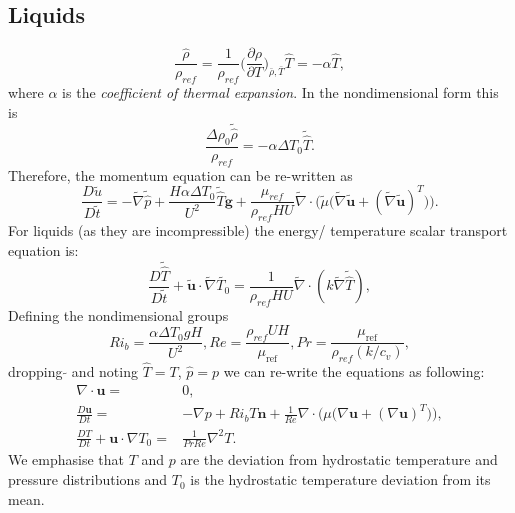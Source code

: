 \documentclass[preprint,12pt]{article}
\begin{document}
\subsection{Liquids}
 \begin{equation}
 \frac{\hat{\rho}}{\rho_{ref}}=\frac{1}{\rho_{ref}}\Big(\frac{\partial \rho}{\partial T}\Big)_{\bar{\rho},\bar{T}}\hat{T}=-\alpha\hat{T},
 \end{equation}
 where $\alpha$ is the \textit{coefficient of thermal expansion}. In the non\textendash dimensional form this is 
 \begin{equation}
\frac{\Delta \rho_0\tilde{\hat{\rho}}}{{\rho_{ref}}}=-\alpha\Delta T_0\tilde{\hat{T}}.
 \end{equation}
 Therefore, the momentum equation can be re-written as
 \begin{equation}
 \frac{D \tilde{u}}{D \tilde{t}}=-\tilde{\nabla}\tilde{\hat{p}}+\frac{H\alpha\Delta T_0}{U^2} \tilde{\hat{T}}\mathbf{g}+\frac{\mu_{ref}}{\rho_{ref}HU}\tilde{\nabla}\cdot\Big({\tilde{\mu}}\big({\tilde{\nabla}} \mathbf{\tilde{u}}+(\tilde{\nabla} \mathbf{\tilde{u}})^T\big)\Big).
 \end{equation}
 For liquids (as they are incompressible) the energy/ temperature scalar transport equation is:
\begin{equation}
\frac{D{\tilde{\hat{T}}}}{D{\tilde{t}}}+\mathbf{\tilde{u}}\cdot\tilde{\nabla}{\tilde{{T_0}}}=\frac{1}{\rho_{ref}HU}\tilde{\nabla}\cdot(k\tilde{\nabla} \tilde{\hat{T}}),
\end{equation}
Defining the non\textendash dimensional groups
\begin{equation}
Ri_b=\frac{\alpha {{\Delta T_0}}g H}{U^2}, Re=\frac{\rho_{ref} U H}{\mu_\text{ref}},  Pr=\frac{\mu_\text{ref}}{\rho_{ref} (k/c_v)},
\end{equation}
dropping $\tilde{}$ and noting $\hat{T}=T$, $\hat{p}=p$ we can re-write the equations as following:
 \begin{subequations}\begin{align}
\nabla\cdot\mathbf{u}=&0,\\
	\frac{D{\mathbf{u}}}{D{t}}=&-{\nabla} {p}+Ri_b T\mathbf{n} +\frac{1}{Re}{\nabla}\cdot\Big({\mu}\big({\nabla} \mathbf{{u}}+({\nabla} \mathbf{{u}})^T\big)\Big),\label{eq:momentum}\\
 \frac{D{T}}{D{t}}+\mathbf{{u}}\cdot{\nabla}{{{T_0}}}=&\frac{1}{Pr Re}\nabla^2 T.
	\end{align}\end{subequations}
We emphasise that $T$ and $p$ are the deviation from hydrostatic temperature and pressure distributions and ${T}_0$ is the hydrostatic temperature deviation from its mean.
\end{document}
